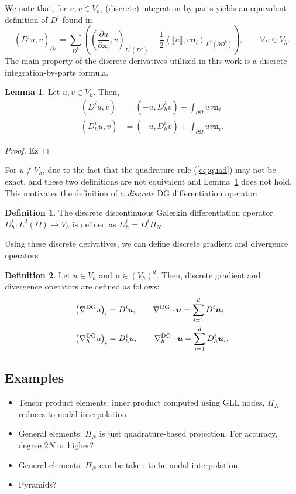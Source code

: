 \documentclass[preprint,10pt]{article}
\theoremstyle{definition}
\newtheorem{definition}{Definition}
\theoremstyle{lemma}
\newtheorem{lemma}{Lemma}
\newcommand{\pd}[2]{\frac{\partial#1}{\partial#2}}
\newcommand{\LRp}[1]{\left( #1 \right)}
\newcommand{\LRa}[1]{\left\langle #1 \right\rangle}
\newcommand{\Grad} {\ensuremath{\nabla}}
\newcommand{\jump}[1] {\ensuremath{\llbracket#1\rrbracket}}
\newcommand{\Oh}{{\Omega_h}}
\newcommand{\LK}{L^2\LRp{D^k}}
\newcommand{\LdK}{L^2\LRp{\partial D^k}}
\begin{document}
We note that, for $u,v \in V_h$, (discrete) integration by parts yields an equivalent definition of $D^i$ found in \cite{hesthaven2004high,Warburton20063205}
\[
\LRp{{D}^i u,v}_{\Oh} = \sum_{D^k} \LRp{\LRp{\pd{u}{\bm{x}_i},v}_{\LK} - \frac{1}{2}\LRa{\jump{u},v\bm{n}_i}_{\LdK}}, \qquad \forall v\in V_h.
\]
The main property of the discrete derivatives utilized in this work is a discrete integration-by-parts formula.  
\begin{lemma}
Let $u,v\in V_h$.  Then, 
\begin{align*}
\LRp{D^i u,v} &= \LRp{-u,D^i_h v} + \int_{\partial \Omega} uv \bm{n}_i\\
\LRp{D_h^i u,v} &= \LRp{-u,D^i_h v} + \int_{\partial \Omega} uv \bm{n}_i.
\end{align*}
\label{lemma:ibp}
\end{lemma}
\begin{proof}
Ez
\end{proof}

For $u \not\in V_h$, due to the fact that the quadrature rule (\ref{eq:quad}) may not be exact, and these two definitions are not equivalent and Lemma~\ref{lemma:ibp} does not hold.  This motivates the definition of a \textit{discrete} DG differentiation operator:
\begin{definition}
The discrete discontinuous Galerkin differentiation operator ${D}^i_h: L^2\LRp{\Omega} \rightarrow V_h$ is defined as $D^i_h = D^i \Pi_N$.
\end{definition}

Using these discrete derivatives, we can define discrete gradient and divergence operators
\begin{definition}
Let $u \in V_h$ and $\bm{u}\in \LRp{V_h}^d$.  Then, discrete gradient and divergence operators are defined as follows:
\begin{align*}
\LRp{\Grad^{\rm DG} u}_i &= D^i u, \qquad \Grad^{\rm DG}\cdot \bm{u} = \sum_{i=1}^d D^i \bm{u}_i\\
\LRp{\Grad^{\rm DG}_h u}_i &= D_h^i u, \qquad \Grad^{\rm DG}_h\cdot \bm{u} = \sum_{i=1}^d D_h^i \bm{u}_i.
\end{align*}
\end{definition}


\subsection{Examples}

\begin{itemize}
\item Tensor product elements: inner product computed using GLL nodes, $\Pi_N$ reduces to nodal interpolation
\item General elements: $\Pi_N$ is just quadrature-based projection.  For accuracy, degree $2N$ or higher?  
\item General elements: $\Pi_N$ can be taken to be nodal interpolation.  
\item Pyramids?  
\end{itemize}
\end{document}

